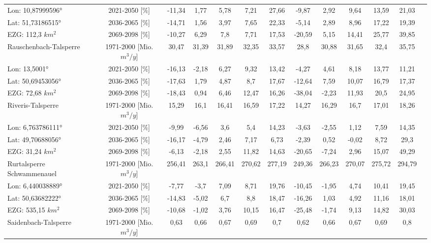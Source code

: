 \begin{longtable}{@{\extracolsep{\fill}}lc|ccccc||cccccc}
\cline{2-13} 
Lon: 10,87999596° & 2021-2050 [\%]  & -11,34 & 1,77 & 5,78 & 7,21 & 27,66 & -9,87 & 2,92 & 9,64 & 13,59 & 21,03 & \\ 
Lat: 51,73186515° & 2036-2065 [\%]  & -14,71 & 1,56 & 3,97 & 7,65 & 22,33 & -5,14 & 2,89 & 8,96 & 17,22 & 19,39 & \\ 
EZG: 112,3 $km^2$ & 2069-2098 [\%]  & -10,27 & 6,29 & 7,8 & 7,71 & 17,53 & -20,59 & 5,15 & 14,41 & 25,77 & 39,85 & \\ 
\hline 
Rauschenbach-Talsperre & 1971-2000 [Mio. $m^3/y$]  & 30,47 & 31,39 & 31,89 & 32,35 & 33,57 & 28,8 & 30,88 & 31,65 & 32,4 & 35,75 & \\ 
\cline{2-13} 
Lon: 13,5001° & 2021-2050 [\%]  & -16,13 & -2,18 & 6,27 & 9,32 & 13,42 & -4,27 & 4,61 & 8,18 & 13,77 & 11,21 & \\ 
Lat: 50,69453056° & 2036-2065 [\%]  & -17,63 & 1,79 & 4,87 & 8,7 & 17,67 & -12,64 & 7,59 & 10,07 & 16,79 & 17,37 & \\ 
EZG: 72,68 $km^2$ & 2069-2098 [\%]  & -18,43 & 0,94 & 6,46 & 12,47 & 16,26 & -38,04 & -2,23 & 11,93 & 20,5 & 24,95 & \\ 
\hline 
Riveris-Talsperre & 1971-2000 [Mio. $m^3/y$]  & 15,29 & 16,1 & 16,41 & 16,59 & 17,22 & 14,27 & 16,29 & 16,7 & 17,01 & 18,26 & \\ 
\cline{2-13} 
Lon: 6,763786111° & 2021-2050 [\%]  & -9,99 & -6,56 & 3,6 & 5,4 & 14,23 & -3,63 & -2,55 & 1,12 & 7,59 & 14,35 & \\ 
Lat: 49,70688056° & 2036-2065 [\%]  & -16,17 & -4,79 & 2,46 & 7,17 & 6,73 & -2,39 & 0,52 & -0,02 & 8,72 & 29,3 & \\ 
EZG: 31,24 $km^2$ & 2069-2098 [\%]  & -6,13 & -2,18 & 2,55 & 11,82 & 14,63 & -20,65 & -7,24 & 2,96 & 15,07 & 49,29 & \\ 
\hline 
Rurtalsperre Schwammenauel & 1971-2000 [Mio. $m^3/y$]  & 256,41 & 263,1 & 266,41 & 270,62 & 277,19 & 249,36 & 266,23 & 270,07 & 275,72 & 294,79 & \\ 
\cline{2-13} 
Lon: 6,440038889° & 2021-2050 [\%]  & -7,77 & -3,7 & 7,09 & 8,71 & 19,76 & -10,45 & -1,95 & 4,74 & 10,41 & 19,45 & \\ 
Lat: 50,63682222° & 2036-2065 [\%]  & -14,83 & -5,02 & 6,7 & 8,8 & 18,47 & -16,26 & 1,03 & 4,92 & 11,16 & 18,01 & \\ 
EZG: 535,15 $km^2$ & 2069-2098 [\%]  & -10,68 & -1,02 & 3,76 & 10,15 & 16,47 & -25,48 & -1,74 & 9,13 & 14,82 & 30,03 & \\ 
\hline 
Saidenbach-Talsperre & 1971-2000 [Mio. $m^3/y$]  & 0,63 & 0,66 & 0,67 & 0,69 & 0,7 & 0,62 & 0,66 & 0,67 & 0,69 & 0,8 & \\ 

\end{longtable}
